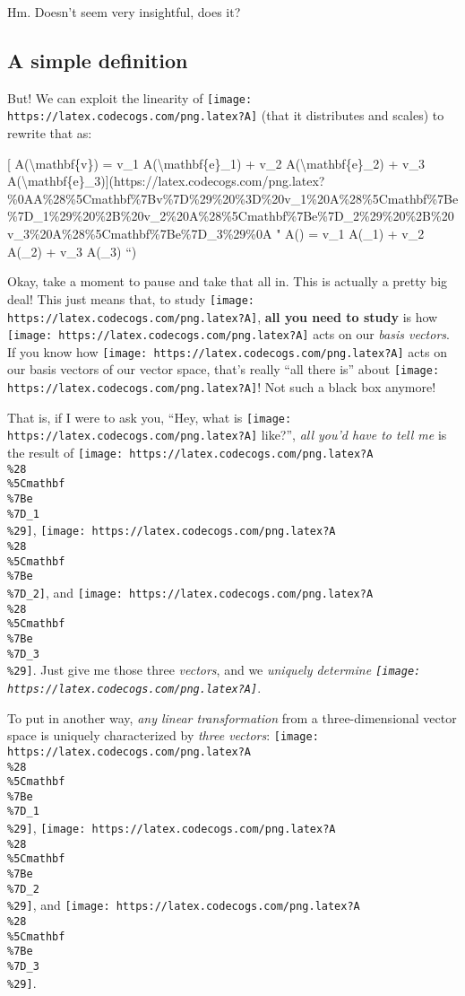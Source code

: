 \documentclass[]{article}
\begin{document}
Hm. Doesn't seem very insightful, does it?

\hypertarget{a-simple-definition}{%
\subsection{A simple definition}\label{a-simple-definition}}

But! We can exploit the linearity of
\texttt{[image: https://latex.codecogs.com/png.latex?A]} (that it distributes
and scales) to rewrite that as:

{[} A(\textbackslash{}mathbf\{v\}) = v\_1 A(\textbackslash{}mathbf\{e\}\_1) +
v\_2 A(\textbackslash{}mathbf\{e\}\_2) + v\_3
A(\textbackslash{}mathbf\{e\}\_3){]}(https://latex.codecogs.com/png.latex?\%0AA\%28\%5Cmathbf\%7Bv\%7D\%29\%20\%3D\%20v\_1\%20A\%28\%5Cmathbf\%7Be\%7D\_1\%29\%20\%2B\%20v\_2\%20A\%28\%5Cmathbf\%7Be\%7D\_2\%29\%20\%2B\%20v\_3\%20A\%28\%5Cmathbf\%7Be\%7D\_3\%29\%0A
" A() = v\_1 A(\_1) + v\_2 A(\_2) + v\_3
A(\_3) ``)

Okay, take a moment to pause and take that all in. This is actually a pretty big
deal! This just means that, to study
\texttt{[image: https://latex.codecogs.com/png.latex?A]}, \textbf{all you need
to study} is how \texttt{[image: https://latex.codecogs.com/png.latex?A]} acts
on our \emph{basis vectors}. If you know how
\texttt{[image: https://latex.codecogs.com/png.latex?A]} acts on our basis
vectors of our vector space, that's really ``all there is'' about
\texttt{[image: https://latex.codecogs.com/png.latex?A]}! Not such a black box
anymore!

That is, if I were to ask you, ``Hey, what is
\texttt{[image: https://latex.codecogs.com/png.latex?A]} like?'', \emph{all
you'd have to tell me} is the result of
\texttt{[image: https://latex.codecogs.com/png.latex?A\\\%28\\\%5Cmathbf\\\%7Be\\\%7D\_1\\\%29]},
\texttt{[image: https://latex.codecogs.com/png.latex?A\\\%28\\\%5Cmathbf\\\%7Be\\\%7D\_2]},
and
\texttt{[image: https://latex.codecogs.com/png.latex?A\\\%28\\\%5Cmathbf\\\%7Be\\\%7D\_3\\\%29]}.
Just give me those three \emph{vectors}, and we \emph{uniquely determine
\texttt{[image: https://latex.codecogs.com/png.latex?A]}}.

To put in another way, \emph{any linear transformation} from a three-dimensional
vector space is uniquely characterized by \emph{three vectors}:
\texttt{[image: https://latex.codecogs.com/png.latex?A\\\%28\\\%5Cmathbf\\\%7Be\\\%7D\_1\\\%29]},
\texttt{[image: https://latex.codecogs.com/png.latex?A\\\%28\\\%5Cmathbf\\\%7Be\\\%7D\_2\\\%29]},
and
\texttt{[image: https://latex.codecogs.com/png.latex?A\\\%28\\\%5Cmathbf\\\%7Be\\\%7D\_3\\\%29]}.
\end{document}
